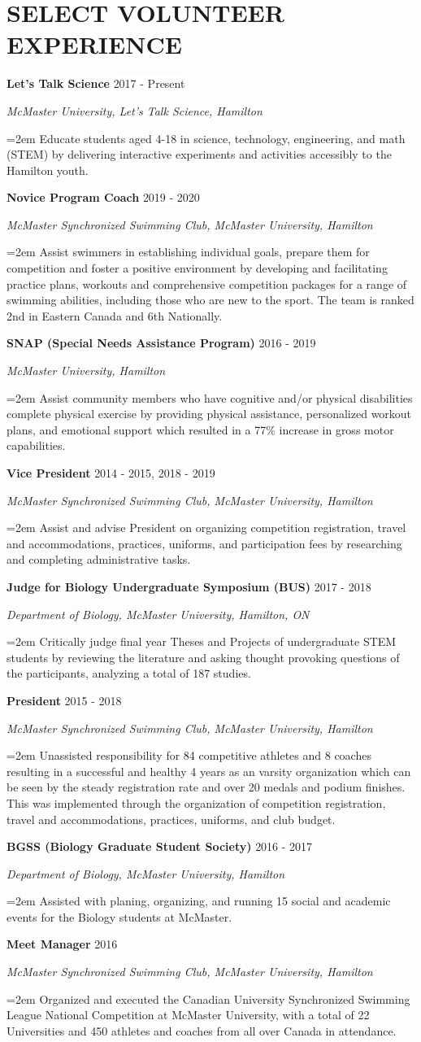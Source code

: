 \documentclass[paper=a4,fontsize=11pt]{scrartcl}	 			%
\newcommand{\NewPart}[1]{\section*{\uppercase{#1}}}
\newcommand{\EducationEntry}[4]{
		\noindent \textbf{#1} \hfill 					%
		\colorbox{White}{%
			\parbox{10em}{%
			\hfill\color{Black}#2}} \par				%
		\noindent \textit{#3} \par					%
		\noindent\hangindent=2em\hangafter=0 \small #4 	%
		\normalsize \par}
\newcommand{\WorkEntry}[4]{						%
		\noindent \textbf{#1} \hfill 					%
		\colorbox{White}{\color{Black}#2} \par		%
		\noindent \textit{#3} \par					%
		\noindent\hangindent=2em\hangafter=0 \small #4 	%
		\normalsize \par}
\begin{document}
\NewPart{Select Volunteer Experience}{}
\WorkEntry{Let's Talk Science}{2017 - Present}{McMaster University, Let's Talk Science, Hamilton}{Educate students aged 4-18 in science, technology, engineering, and math (STEM) by delivering interactive experiments and activities accessibly to the Hamilton youth.}
\WorkEntry{Novice Program Coach}{2019 - 2020}{McMaster Synchronized Swimming Club, McMaster University, Hamilton}{Assist swimmers in establishing individual goals, prepare them for competition and foster a positive environment by developing and facilitating practice plans, workouts and comprehensive competition packages for a range of swimming abilities, including those who are new to the sport. The team is ranked 2nd in Eastern Canada and 6th Nationally.}
\WorkEntry{SNAP (Special Needs Assistance Program)}{2016 - 2019}{McMaster University, Hamilton}{Assist community members who have cognitive and/or physical disabilities complete physical exercise by providing physical assistance, personalized workout plans, and emotional support which resulted in a 77\% increase in gross motor capabilities.}
\WorkEntry{Vice President}{2014 - 2015, 2018 - 2019}{McMaster Synchronized Swimming Club, McMaster University, Hamilton}{Assist and advise President on organizing competition registration, travel and accommodations, practices, uniforms, and participation fees by researching and completing administrative tasks.}
\WorkEntry{Judge for Biology Undergraduate Symposium (BUS)}{2017 - 2018}{Department of Biology, McMaster University, Hamilton, ON}{Critically judge final year Theses and Projects of undergraduate STEM students by reviewing the literature and asking thought provoking questions of the participants, analyzing a total of 187 studies.}
\WorkEntry{President}{2015 - 2018}{McMaster Synchronized Swimming Club, McMaster University, Hamilton}{Unassisted responsibility for 84 competitive athletes and 8 coaches resulting in a successful and healthy 4 years as an varsity organization which can be seen by the steady registration rate and over 20 medals and podium finishes. This was implemented through the organization of competition registration, travel and accommodations, practices, uniforms, and club budget.}
\WorkEntry{BGSS (Biology Graduate Student Society)}{2016 - 2017}{Department of Biology, McMaster University, Hamilton}{Assisted with planing, organizing, and running 15 social and academic events for the Biology students at McMaster.}
\WorkEntry{Meet Manager}{2016}{McMaster Synchronized Swimming Club, McMaster University, Hamilton}{Organized and executed the Canadian University Synchronized Swimming League National Competition at McMaster University, with a total of 22 Universities and 450 athletes and coaches from all over Canada in attendance.}
\end{document}

